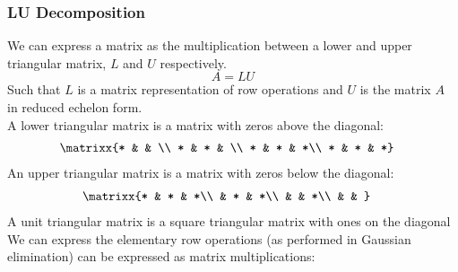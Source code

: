 \subsubsection{LU Decomposition}
We can express a matrix as the multiplication between a lower and upper triangular matrix, $L$ and $U$ respectively.
$$A=LU$$
Such that $L$ is a matrix representation of row operations and $U$ is the matrix $A$ in reduced echelon form.\\
A lower triangular matrix is a matrix with zeros above the diagonal:
\begin{align*}
    &\matrixx{* & & \\ * & * & \\ * & * & *\\ * & * & *}
\end{align*}
An upper triangular matrix is a matrix with zeros below the diagonal:
\begin{align*}
    &\matrixx{* & * & *\\ & * & *\\ & & *\\ & & }
\end{align*}
A unit triangular matrix is a square triangular matrix with ones on the diagonal\\
We can express the elementary row operations (as performed in Gaussian elimination) can be expressed as matrix multiplications:
